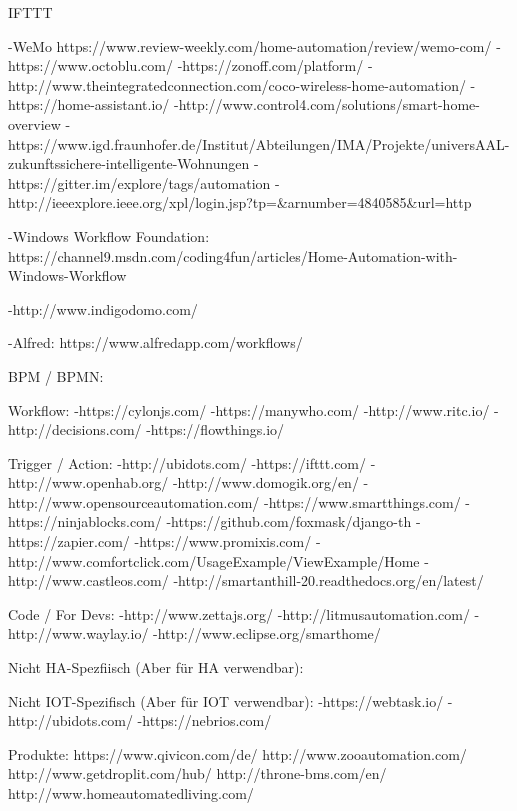 IFTTT


-WeMo https://www.review-weekly.com/home-automation/review/wemo-com/
-https://www.octoblu.com/
-https://zonoff.com/platform/
-http://www.theintegratedconnection.com/coco-wireless-home-automation/
-https://home-assistant.io/
-http://www.control4.com/solutions/smart-home-overview
-https://www.igd.fraunhofer.de/Institut/Abteilungen/IMA/Projekte/universAAL-zukunftssichere-intelligente-Wohnungen 
-https://gitter.im/explore/tags/automation
-http://ieeexplore.ieee.org/xpl/login.jsp?tp=&arnumber=4840585&url=http%

-Windows Workflow Foundation: https://channel9.msdn.com/coding4fun/articles/Home-Automation-with-Windows-Workflow


-http://www.indigodomo.com/

-Alfred: https://www.alfredapp.com/workflows/

BPM / BPMN:

Workflow:
-https://cylonjs.com/
-https://manywho.com/
-http://www.ritc.io/
-http://decisions.com/
-https://flowthings.io/

Trigger / Action:
-http://ubidots.com/
-https://ifttt.com/
-http://www.openhab.org/
-http://www.domogik.org/en/
-http://www.opensourceautomation.com/
-https://www.smartthings.com/
-https://ninjablocks.com/
-https://github.com/foxmask/django-th
-https://zapier.com/
-https://www.promixis.com/
-http://www.comfortclick.com/UsageExample/ViewExample/Home
-http://www.castleos.com/
-http://smartanthill-20.readthedocs.org/en/latest/

Code / For Devs:
-http://www.zettajs.org/
-http://litmusautomation.com/
-http://www.waylay.io/
-http://www.eclipse.org/smarthome/

Nicht HA-Spezfiisch (Aber für HA verwendbar):

Nicht IOT-Spezifisch (Aber für IOT verwendbar):
-https://webtask.io/
-http://ubidots.com/
-https://nebrios.com/

Produkte:
https://www.qivicon.com/de/
http://www.zooautomation.com/
http://www.getdroplit.com/hub/
http://throne-bms.com/en/
http://www.homeautomatedliving.com/
